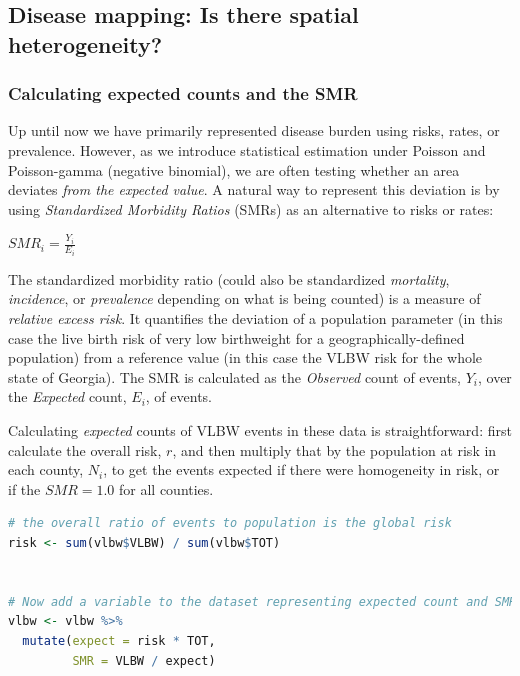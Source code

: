 \documentclass[
]{book}
\begin{document}
\hypertarget{disease-mapping-is-there-spatial-heterogeneity}{%
\subsection{Disease mapping: Is there spatial heterogeneity?}\label{disease-mapping-is-there-spatial-heterogeneity}}

\hypertarget{calculating-expected-counts-and-the-smr}{%
\subsubsection{Calculating expected counts and the SMR}\label{calculating-expected-counts-and-the-smr}}

Up until now we have primarily represented disease burden using risks, rates, or prevalence. However, as we introduce statistical estimation under Poisson and Poisson-gamma (negative binomial), we are often testing whether an area deviates \emph{from the expected value}. A natural way to represent this deviation is by using \emph{Standardized Morbidity Ratios} (SMRs) as an alternative to risks or rates:

\(SMR_i=\frac{Y_i}{E_i}\)

The standardized morbidity ratio (could also be standardized \emph{mortality}, \emph{incidence}, or \emph{prevalence} depending on what is being counted) is a measure of \emph{relative excess risk}. It quantifies the deviation of a population parameter (in this case the live birth risk of very low birthweight for a geographically-defined population) from a reference value (in this case the VLBW risk for the whole state of Georgia). The SMR is calculated as the \emph{Observed} count of events, \(Y_i\), over the \emph{Expected} count, \(E_i\), of events.

Calculating \emph{expected} counts of VLBW events in these data is straightforward: first calculate the overall risk, \(r\), and then multiply that by the population at risk in each county, \(N_i\), to get the events expected if there were homogeneity in risk, or if the \(SMR=1.0\) for all counties.

\begin{lstlisting}[language=R]
# the overall ratio of events to population is the global risk
risk <- sum(vlbw$VLBW) / sum(vlbw$TOT) 


# Now add a variable to the dataset representing expected count and SMR
vlbw <- vlbw %>%
  mutate(expect = risk * TOT,
         SMR = VLBW / expect)
\end{lstlisting}
\end{document}
